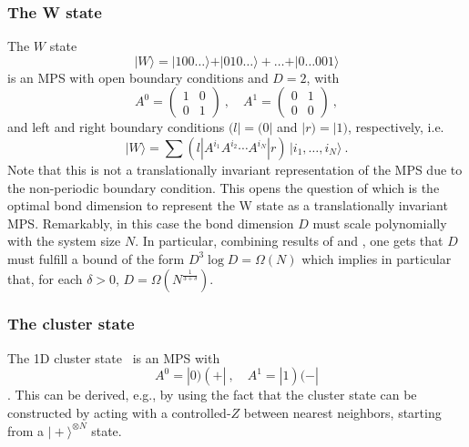 \documentclass[rmp,aps,reprint,superscriptaddress,nobalancelastpage]{revtex4-1}
\newcommand{\ket}[1]{\vert#1\rangle}
\begin{document}
\subsubsection{The W state} The $W$ state
\[
    \ket{W}=\ket{100\dots}+\ket{010\dots}+\dots+\ket{0\dots001}
\]
is an MPS with open boundary conditions and $D=2$, with
\begin{equation}
    A^{0}=\begin{pmatrix}1&0\\0&1\end{pmatrix}\ ,\quad
    A^{1}=\begin{pmatrix}0&1\\0&0\end{pmatrix}\ ,
\end{equation}
and left and right boundary conditions $(l|=(0|$ and $|r)=|1)$, respectively, i.e.
\begin{equation}
    \ket W = \sum (l|A^{i_1}A^{i_2}\cdots A^{i_N}|r)\,
    \ket{i_1,\dots,i_N} \ .
\end{equation}
Note that this is not a translationally invariant representation of the MPS due to the non-periodic boundary condition. This opens the question of which is the optimal bond dimension to represent the W state as a translationally invariant MPS. Remarkably, in this case the bond dimension $D$ must scale polynomially with the system size $N$. In particular, combining results of \citet{perez-garcia:mps-reps} and \citet{michalek:wielandt-Dsquare}, one gets that $D$ must fulfill a bound of the form $D^3\log D =\Omega(N)$ which implies in particular that, for each $\delta>0$, $D=\Omega(N^{\frac{1}{3+\delta}})$.

\subsubsection{The cluster state} The 1D cluster state~\cite{raussendorf:cluster-short} is an MPS with
\[
    A^0=|0)(+|\ ,\quad A^1=|1)(-|
\]
\cite{verstraete:mbc-peps}.
This can be derived, e.g., by using the fact that the cluster state can be constructed by acting with a controlled-$Z$ between nearest neighbors, starting from a $\ket{+}^{\otimes N}$ state.
\end{document}

